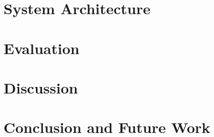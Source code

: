 \documentclass[a4paper,10pt,twoside]{report}
\begin{document}
\clearpage

\chapter{System Architecture}\label{chapter:systemArchitecture}


\clearpage

\chapter{Evaluation}\label{chapter:evaluation}


\clearpage

\chapter{Discussion}\label{chapter:discussion}


\clearpage

\chapter{Conclusion and Future Work}\label{chapter:conclusions}


\clearpage

%



\clearpage

\appendix
{}


\end{document}
